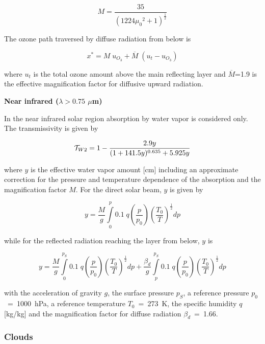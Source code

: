 \begin{equation}
M= \frac{35}{(1224 {\mu_0}^2 +1)^{\frac{1}{2}}}
\end{equation}

The ozone path traversed by diffuse radiation from
below is

\begin{equation}
x^{*}=M \; u_{O_3}+\overline{M} \; (u_t -u_{O_3})
\end{equation}

where $u_t$ is the total ozone amount above the main
reflecting layer and $\overline{M}$=1.9
is the effective magnification factor for diffusive
upward radiation.

{\bf  Near infrared ($\lambda > 0.75$ $\mu$m)}

In the near infrared solar region  absorption by water
vapor
is considered only. The transmissivity is given by

\begin{equation}
{\cal T}_{W2}=1-\frac{2.9 y}{(1+141.5y)^{0.635} +
5.925y}
\end{equation}

where $y$ is the effective water vapor amount [cm]
including an approximate correction for the
pressure and temperature dependence of the absorption
and the magnification factor $M$. For 
the direct solar beam, $y$ is given by

\begin{equation}
y=\frac{M}{g}
 \int\limits^p_0 0.1 \; q
\left(\frac{p}{p_0}\right)\left(\frac{T_0}{T}\right)^
{\frac{1}{2}} dp
\end{equation}

while for the reflected radiation reaching the layer from
below, $y$ is 

\begin{equation}
y=\frac{M}{g}
 \int\limits^{p_S}_0
 0.1 \; q
\left(\frac{p}{p_0}\right)\left(\frac{T_0}{T}\right)^
{\frac{1}{2}} dp
+
\frac{\beta_d}{g} \int\limits^{p_S}_{p}
 0.1 \; q
\left(\frac{p}{p_0}\right)\left(\frac{T_0}{T}\right)^
{\frac{1}{2}} dp
\end{equation}

with the acceleration of gravity $g$, the surface
pressure $p_S$, a reference pressure
$p_0$~=~1000~hPa, a  reference temperature
$T_0$~=~273~K, the  specific humidity $q$ 
[kg/kg] and the magnification factor for diffuse
radiation $\beta_d$~=~1.66. 

\subsubsection*{Clouds}

